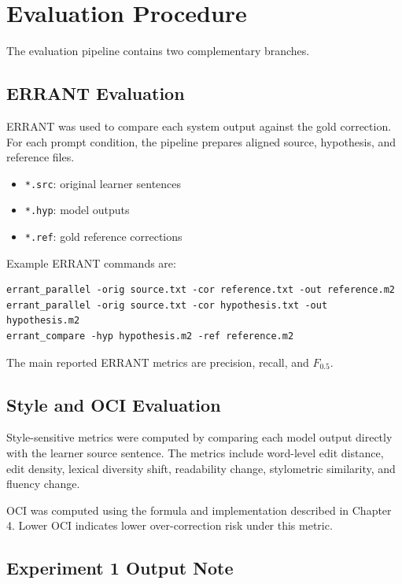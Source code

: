 \section{Evaluation Procedure}

The evaluation pipeline contains two complementary branches.

\subsection{ERRANT Evaluation}

ERRANT was used to compare each system output against the gold correction. For each prompt condition, the pipeline prepares aligned source, hypothesis, and reference files.

\begin{itemize}
    \item \texttt{*.src}: original learner sentences
    \item \texttt{*.hyp}: model outputs
    \item \texttt{*.ref}: gold reference corrections
\end{itemize}

Example ERRANT commands are:

\begin{verbatim}
errant_parallel -orig source.txt -cor reference.txt -out reference.m2
errant_parallel -orig source.txt -cor hypothesis.txt -out hypothesis.m2
errant_compare -hyp hypothesis.m2 -ref reference.m2
\end{verbatim}

The main reported ERRANT metrics are precision, recall, and $F_{0.5}$.

\subsection{Style and OCI Evaluation}

Style-sensitive metrics were computed by comparing each model output directly with the learner source sentence. The metrics include word-level edit distance, edit density, lexical diversity shift, readability change, stylometric similarity, and fluency change.

OCI was computed using the formula and implementation described in Chapter 4. Lower OCI indicates lower over-correction risk under this metric.

\subsection{Experiment 1 Output Note}


